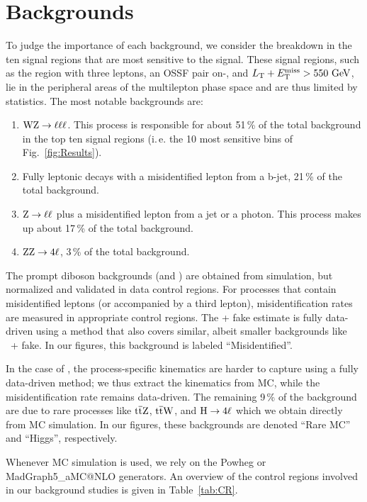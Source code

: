\chapter{Backgrounds}
\label{chap:Backgrounds}

To judge the importance of each background, we consider the breakdown in the ten signal regions that are most sensitive to the signal. These signal regions, such as the region with three leptons, an OSSF pair on-\Z, and $L_\textrm{T} + E_{\mathrm{T}}^{\text{miss}} > 550\,\,\text{Ge\hspace{-.08em}V}$, lie in the peripheral areas of the multilepton phase space and are thus limited by statistics. The most notable backgrounds are:
\begin{enumerate}
	\item $\mathrm{W}\mathrm{Z} \to \ell\ell\ell$. This process is responsible for about 51\,\% of the total background in the top ten signal regions (i.\,e. the 10 most sensitive bins of Fig.~\ref{fig:Results}).
	\item Fully leptonic \ttbar decays with a misidentified lepton from a b-jet, 21\,\% of the total background.
	\item $\mathrm{Z} \to \ell\ell$ plus a misidentified lepton from a jet or a photon. This process makes up about 17\,\% of the total background.
	\item $\mathrm{Z}\mathrm{Z} \to 4\ell$, 3\,\% of the total background.
\end{enumerate}

The prompt diboson backgrounds (\WZ and \ZZ) are obtained from simulation, but normalized and validated in data control regions. For processes that contain misidentified leptons (\Z or \ttbar accompanied by a third lepton), misidentification rates are measured in appropriate control regions. The \Z + fake estimate is fully data-driven using a method that also covers similar, albeit smaller backgrounds like \PW\PW\ + fake. In our figures, this background is labeled ``Misidentified''.

In the case of \ttbar, the process-specific kinematics are harder to capture using a fully data-driven method; we thus extract the kinematics from MC, while the misidentification rate remains data-driven. The remaining 9\,\% of the background are due to rare processes like $\mathrm{t}\overline{\mathrm{t}}\mathrm{Z}$, $\mathrm{t}\overline{\mathrm{t}}\mathrm{W}$, and $\mathrm{H} \to 4\ell$ which we obtain directly from MC simulation. In our figures, these backgrounds are denoted ``Rare MC'' and ``Higgs'', respectively.

Whenever MC simulation is used, we rely on the Powheg or MadGraph5\_aMC@NLO generators. An overview of the control regions involved in our background studies is given in Table~\ref{tab:CR}.

